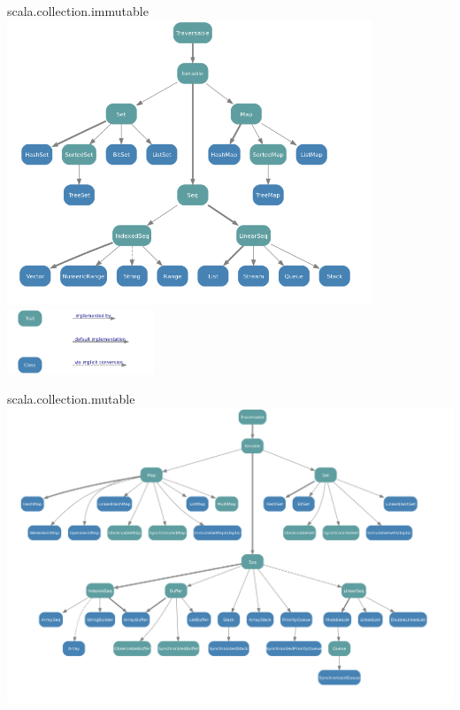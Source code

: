 \ifkompendium
\else

\begin{Slide}{scala.collection.immutable}
\includegraphics[width=0.82\textwidth]{../img/collection/collection-immutable}
\includegraphics[width=0.33\textwidth]{../img/collection/collection-legend}
\end{Slide}


\begin{Slide}{scala.collection.mutable}
\includegraphics[width=1.05\textwidth]{../img/collection/collection-mutable}
\end{Slide}

\fi


